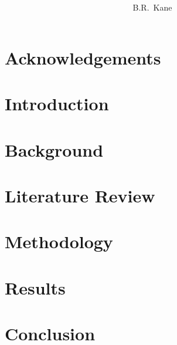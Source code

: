 \documentclass[12pt,a4paper,openany,
               afrikaans,UKenglish,
               masters-t,goldenblock
              ]{stb-thesis}
\title{\bfseries
       \AorE{%
             Afrikaans title here\\[1ex]
             \normalfont\small\itshape
             (``Ergo: A Gesture-Based Computer Interaction Device'')
            }{%
             Ergo: A Gesture-Based Computer Interaction Device}}
\author{B.R.\ Kane}{Boyd Robert Kane}
\begin{document}
\frontmatter%
\TitlePage

\DeclarationPage



\chapter*{Acknowledgements}


\tableofcontents

\listoffigures
\listoftables


\mainmatter%

\chapter{Introduction}\label{chap:introduction}


\chapter{Background}\label{chap:background}


\chapter{Literature Review}\label{chap:literature-review}


\chapter{Methodology}\label{chap:methodology}


\chapter{Results}\label{chap:results}


\chapter{Conclusion}\label{chap:conclusion}


\appendix%


\backmatter%


\end{document}
